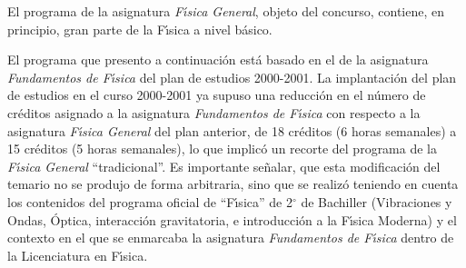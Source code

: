 El programa de la asignatura {\it  F\'{\i}sica General}, objeto
del concurso,
contiene, en principio, gran parte de la F\'{\i}sica a 
 nivel b\'{a}sico.

El programa que presento a continuaci\'{o}n est\'{a} basado 
en el de la asignatura  {\it Fundamentos de F\'{\i}sica}
del plan de estudios  2000-2001.
La implantaci\'{o}n del plan  de estudios en el curso
2000-2001 ya supuso una reducci\'{o}n en el
  n\'{u}mero de cr\'{e}ditos asignado a la
asignatura {\it Fundamentos de F\'{\i}sica} 
con respecto a la asignatura {\it F\'{\i}sica General} del plan anterior,
 de 18 cr\'{e}ditos (6 horas semanales) a 15 cr\'{e}ditos (5 horas semanales), lo que
 implic\'{o} un recorte del programa de la {\it F\'{\i}sica General} ``tradicional''.
Es importante se\~{n}alar, que esta modificaci\'{o}n del temario no se produjo
de forma arbitraria, sino que se realiz\'{o} teniendo en cuenta 
los contenidos del programa oficial de ``F\'{\i}sica''  de 2{$^\circ$}
de Bachiller (Vibraciones y Ondas, \'{O}ptica, interacci\'{o}n gravitatoria,
e introducci\'{o}n a la F\'{\i}sica Moderna)
y el 
contexto en el que se enmarcaba la asignatura {\it Fundamentos de F\'{\i}sica} 
dentro de la Licenciatura en F\'{\i}sica.


